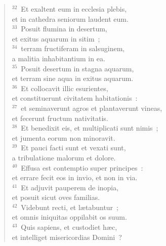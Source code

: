 \begin{flushleft}
\begin{verse}
${}^{32}$~Et exaltent eum in ecclesia plebis,\\ et in cathedra seniorum laudent eum.\\
${}^{33}$~Posuit flumina in desertum,\\ et exitus aquarum in sitim~;\\
${}^{34}$~terram fructiferam in salsuginem,\\ a malitia inhabitantium in ea.\\
${}^{35}$~Posuit desertum in stagna aquarum,\\ et terram sine aqua in exitus aquarum.\\
${}^{36}$~Et collocavit illic esurientes,\\ et constituerunt civitatem habitationis~:\\
${}^{37}$~et seminaverunt agros et plantaverunt vineas,\\ et fecerunt fructum nativitatis.\\
${}^{38}$~Et benedixit eis, et multiplicati sunt nimis~;\\ et jumenta eorum non minoravit.\\
${}^{39}$~Et pauci facti sunt et vexati sunt,\\ a tribulatione malorum et dolore.\\
${}^{40}$~Effusa est contemptio super principes~:\\ et errare fecit eos in invio, et non in via.\\
${}^{41}$~Et adjuvit pauperem de inopia,\\ et posuit sicut oves familias.\\
${}^{42}$~Videbunt recti, et l\ae tabuntur~;\\ et omnis iniquitas oppilabit os suum.\\
${}^{43}$~Quis sapiens, et custodiet h\ae c,\\ et intelliget misericordias Domini~?\end{verse}\end{flushleft}



